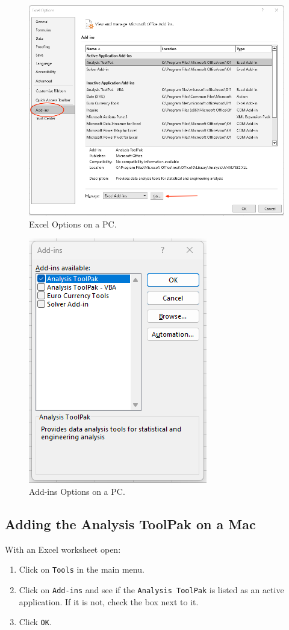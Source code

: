 \documentclass[
]{book}
\providecommand{\tightlist}{%
  \setlength{\itemsep}{0pt}\setlength{\parskip}{0pt}}
\begin{document}
\begin{figure}

{\centering \includegraphics[width=0.75\linewidth]{toolpak-pc1} 

}

\caption{Excel Options on a PC.}\label{fig:analysis-toolpak-pc1}
\end{figure}
\begin{figure}

{\centering \includegraphics[width=0.35\linewidth]{toolpak-pc2} 

}

\caption{Add-ins Options on a PC.}\label{fig:analysis-toolpak-pc2}
\end{figure}

\hypertarget{adding-the-analysis-toolpak-on-a-mac}{%
\subsection{Adding the Analysis ToolPak on a Mac}\label{adding-the-analysis-toolpak-on-a-mac}}

With an Excel worksheet open:

\begin{enumerate}
\def\labelenumi{\arabic{enumi}.}
\tightlist
\item
  Click on \texttt{Tools} in the main menu.
\item
  Click on \texttt{Add-ins} and see if the \texttt{Analysis\ ToolPak} is listed as an active application. If it is not, check the box next to it.
\item
  Click \texttt{OK}.
\end{enumerate}
\end{document}
